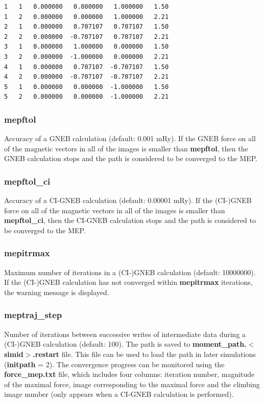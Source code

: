 \documentclass{article}
\begin{document}
\begin{Verbatim}
1   1   0.000000   0.000000   1.000000   1.50
1   2   0.000000   0.000000   1.000000   2.21
2   1   0.000000   0.707107   0.707107   1.50
2   2   0.000000  -0.707107   0.707107   2.21
3   1   0.000000   1.000000   0.000000   1.50
3   2   0.000000  -1.000000   0.000000   2.21
4   1   0.000000   0.707107  -0.707107   1.50
4   2   0.000000  -0.707107  -0.707107   2.21
5   1   0.000000   0.000000  -1.000000   1.50
5   2   0.000000   0.000000  -1.000000   2.21
\end{Verbatim}

\subsubsection*{mepftol}
Accuracy of a GNEB calculation (default: 0.001 mRy). If the GNEB force on all of the magnetic vectors in all of the images is smaller than {\bf mepftol}, then the GNEB calculation stops and the path is considered to be converged to the MEP.

\subsubsection*{mepftol\_ci}
Accuracy of a CI-GNEB calculation (default: 0.00001 mRy). If the (CI-)GNEB force on all of the magnetic vectors in all of the images is smaller than {\bf mepftol\_ci}, then the CI-GNEB calculation stops and the path is considered to be converged to the MEP.

\subsubsection*{mepitrmax}
Maximum number of iterations in a (CI-)GNEB calculation (default: 10000000). If the (CI-)GNEB calculation has not converged within {\bf mepitrmax} iterations, the warning message is displayed.

\subsubsection*{meptraj\_step}
Number of iterations between successive writes of intermediate data during a (CI-)GNEB calculation (default: 100). The path is saved to {\bf moment\_path.$<$simid$>$.restart} file. This file can be used to load the path in later simulations ({\bf initpath} = 2). The convergence progress can be monitored using the {\bf force\_mep.txt} file, which includes four columns: iteration number, magnitude of the maximal force, image corresponding to the maximal force and the climbing image number (only appears when a CI-GNEB calculation is performed).
\end{document}
